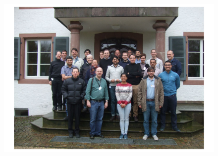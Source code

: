 \vfill\eject

\begin{figure}[t!]
\includegraphics[width=1.0\linewidth]{figures/group-photo}
\end{figure}

